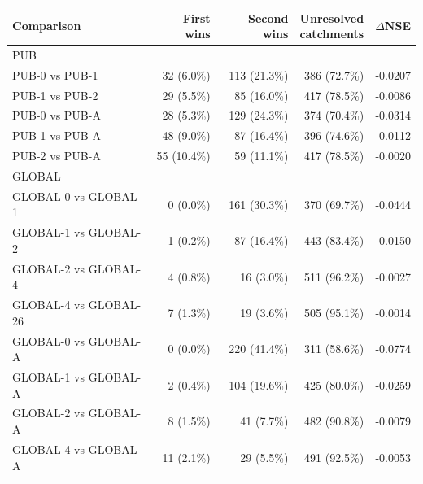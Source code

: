 \begin{tabular}{@{}lrrrr@{}}
\toprule
Comparison & First wins & Second wins & \shortstack{Unresolved\\catchments} & $\Delta$NSE \\
\midrule
\multicolumn{5}{l}{PUB} \\
PUB-0 vs PUB-1 & 32 (6.0\%) & 113 (21.3\%) & 386 (72.7\%) & -0.0207 \\
PUB-1 vs PUB-2 & 29 (5.5\%) & 85 (16.0\%) & 417 (78.5\%) & -0.0086 \\
PUB-0 vs PUB-A & 28 (5.3\%) & 129 (24.3\%) & 374 (70.4\%) & -0.0314 \\
PUB-1 vs PUB-A & 48 (9.0\%) & 87 (16.4\%) & 396 (74.6\%) & -0.0112 \\
PUB-2 vs PUB-A & 55 (10.4\%) & 59 (11.1\%) & 417 (78.5\%) & -0.0020 \\
\midrule
\multicolumn{5}{l}{GLOBAL} \\
GLOBAL-0 vs GLOBAL-1 & 0 (0.0\%) & 161 (30.3\%) & 370 (69.7\%) & -0.0444 \\
GLOBAL-1 vs GLOBAL-2 & 1 (0.2\%) & 87 (16.4\%) & 443 (83.4\%) & -0.0150 \\
GLOBAL-2 vs GLOBAL-4 & 4 (0.8\%) & 16 (3.0\%) & 511 (96.2\%) & -0.0027 \\
GLOBAL-4 vs GLOBAL-26 & 7 (1.3\%) & 19 (3.6\%) & 505 (95.1\%) & -0.0014 \\
GLOBAL-0 vs GLOBAL-A & 0 (0.0\%) & 220 (41.4\%) & 311 (58.6\%) & -0.0774 \\
GLOBAL-1 vs GLOBAL-A & 2 (0.4\%) & 104 (19.6\%) & 425 (80.0\%) & -0.0259 \\
GLOBAL-2 vs GLOBAL-A & 8 (1.5\%) & 41 (7.7\%) & 482 (90.8\%) & -0.0079 \\
GLOBAL-4 vs GLOBAL-A & 11 (2.1\%) & 29 (5.5\%) & 491 (92.5\%) & -0.0053 \\
\bottomrule
\end{tabular}
